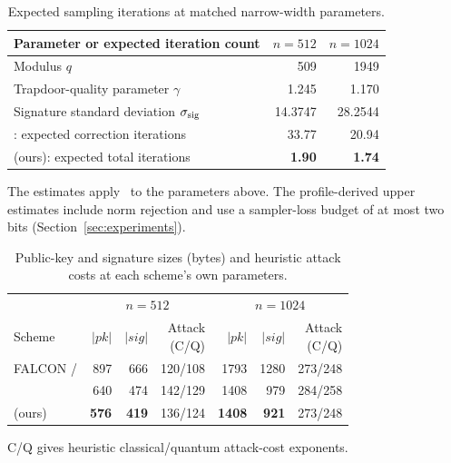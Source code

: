 
\begin{table}[H]
\centering\small
\caption{Expected sampling iterations at matched narrow-width parameters.}
\label{tab:intro-sampling}
\renewcommand{\arraystretch}{1.13}
\begin{tabular*}{\linewidth}{@{\extracolsep{\fill}}lrr@{}}
\toprule
Parameter or expected iteration count & $n=512$ & $n=1024$\\
\midrule
Modulus $q$ & 509 & 1949\\
Trapdoor-quality parameter $\gamma$ & 1.245 & 1.170\\
Signature standard deviation $\sigma_{\rm sig}$ & 14.3747 & 28.2544\\
\midrule
\FalconWS{}: expected correction iterations & 33.77 & 20.94\\
\FalconPP{} (ours): expected total iterations & \textbf{1.90} & \textbf{1.74}\\
\bottomrule
\end{tabular*}

\smallskip
\begin{minipage}{\linewidth}
\footnotesize
The \FalconWS{} estimates apply~\cite[Lem.~18]{ZhangEtAl2025WeakSmoothness}
to the parameters above. The \FalconPP{} profile-derived upper estimates
include norm rejection and use a sampler-loss budget of at most two bits
(Section~\ref{sec:experiments}).
\end{minipage}
\end{table}

\begin{table}[H]
\centering\small
\caption{Public-key and signature sizes (bytes) and heuristic attack costs
at each scheme's own parameters.}
\label{tab:intro-comparison}
\setlength{\tabcolsep}{3pt}
\renewcommand{\arraystretch}{1.15}
\begin{tabular*}{\linewidth}{@{\extracolsep{\fill}}lrrrrrr@{}}
\toprule
& \multicolumn{3}{c}{$n=512$} & \multicolumn{3}{c}{$n=1024$}\\
\cmidrule(lr){2-4}\cmidrule(l){5-7}
Scheme & $|pk|$ & $|sig|$ & \shortstack{Attack\\(C/Q)}
       & $|pk|$ & $|sig|$ & \shortstack{Attack\\(C/Q)}\\
\midrule
FALCON / \FalconPlus{} & 897 & 666 & 120/108 & 1793 & 1280 & 273/248\\
\FalconWS{} & 640 & 474 & 142/129 & 1408 & 979 & 284/258\\
\FalconPP{} (ours) & \textbf{576} & \textbf{419} & 136/124
            & \textbf{1408} & \textbf{921} & 273/248\\
\bottomrule
\end{tabular*}

\smallskip
\begin{minipage}{\linewidth}
\footnotesize
C/Q gives heuristic classical/quantum attack-cost exponents.
\end{minipage}
\end{table}

